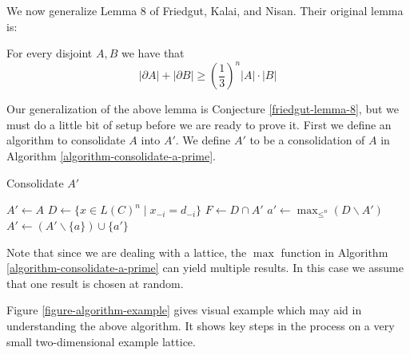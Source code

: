 	We now generalize Lemma 8 of Friedgut, Kalai, and Nisan. Their original lemma is:

	\begin{lemma}
		For every disjoint $A, B$ we have that
		\[
			|\partial A| + |\partial B| \ge \left( \frac{1}{3} \right)^n |A| \cdot |B|
		\]
	\end{lemma}

	Our generalization of the above lemma is Conjecture \ref{friedgut-lemma-8}, but we must do a little bit of setup before we are ready to prove it. First we define an algorithm to consolidate $A$ into $A'$. We define $A'$ to be a consolidation of $A$ in Algorithm \ref{algorithm-consolidate-a-prime}.

	\begin{algorithm}
		\caption{Consolidate $A'$}
		\label{algorithm-consolidate-a-prime}
		\begin{algorithmic}
			\State $A' \gets A$
					\State $D \gets \{x \in L(C)^n \mid x_{-i} = d_{-i}\}$
					\State $F \gets D \cap A'$
						\State $a' \gets \max_{\le^n}(D \backslash A')$
						\State $A' \gets (A' \backslash \{a\}) \cup \{a'\}$ 
					\EndFor
				\EndFor
			\EndFor
		\end{algorithmic}
	\end{algorithm}

	Note that since we are dealing with a lattice, the $\max$ function in Algorithm \ref{algorithm-consolidate-a-prime} can yield multiple results. In this case we assume that one result is chosen at random.

	Figure \ref{figure-algorithm-example} gives visual example which may aid in understanding the above algorithm. It shows key steps in the process on a very small two-dimensional example lattice.


